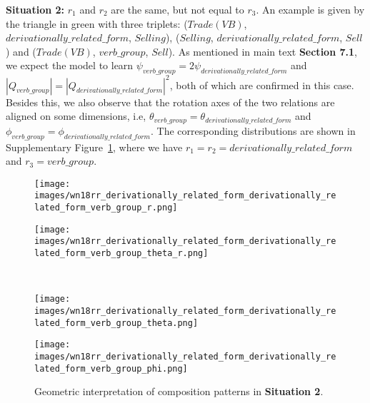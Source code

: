 \documentclass[11pt]{article}
\begin{document}
\textbf{Situation 2:} \(r_1\) and \(r_2\) are the same, but not equal to \(r_3\). An example is given by the triangle in green with three triplets: (\(Trade(VB)\), \(derivationally\_related\_form\), \(Selling\)), (\(Selling\), \(derivationally\_related\_form\), \(Sell\)) and (\(Trade(VB)\), \(verb\_group\), \(Sell\)). As mentioned in main text \textbf{Section 7.1}, we expect the model to learn \(\psi_{verb\_group} = 2\psi_{derivationally\_related\_form}\) and \(|Q_{verb\_group}|=|Q_{derivationally\_related\_form}|^2\), both of which are confirmed in this case. Besides this, we also observe that the rotation axes of the two relations are aligned on some dimensions, i.e, \(\theta_{verb\_group} = \theta_{derivationally\_related\_form}\) and \(\phi_{verb\_group} = \phi_{derivationally\_related\_form}\). The corresponding distributions are shown in Supplementary Figure~\ref{119}, where we have \(r_1=r_2=derivationally\_related\_form\) and \(r_3=verb\_group\). 


\begin{figure}[htbp]
\centering
\begin{minipage}{3.5cm}
\centering
\texttt{[image: images/wn18rr\_derivationally\_related\_form\_derivationally\_related\_form\_verb\_group\_r.png]}
\end{minipage}
\begin{minipage}{3.5cm}
\centering
\texttt{[image: images/wn18rr\_derivationally\_related\_form\_derivationally\_related\_form\_verb\_group\_theta\_r.png]}
\end{minipage}
\\
\begin{minipage}{3.5cm}
\centering
\texttt{[image: images/wn18rr\_derivationally\_related\_form\_derivationally\_related\_form\_verb\_group\_theta.png]}
\end{minipage}
\begin{minipage}{3.5cm}
\centering
\texttt{[image: images/wn18rr\_derivationally\_related\_form\_derivationally\_related\_form\_verb\_group\_phi.png]}
\end{minipage}
\caption{Geometric interpretation of composition patterns in \textbf{Situation 2}.}
\label{119}
\end{figure}
\end{document}
